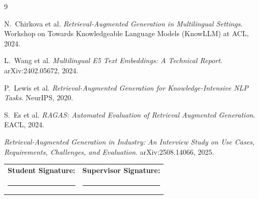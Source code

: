 \documentclass[10pt,a4paper]{article}
\begin{document}
\begingroup
\renewcommand{\refname}{\texorpdfstring{\color{mainblue}}{}Preliminary References}
\scriptsize
\begin{thebibliography}{9}
\setlength{\itemsep}{0pt}

N.\ Chirkova et al.
\textit{Retrieval-Augmented Generation in Multilingual Settings}.
Workshop on Towards Knowledgeable Language Models (KnowLLM) at ACL, 2024.

L.\ Wang et al.
\textit{Multilingual E5 Text Embeddings: A Technical Report}.
arXiv:2402.05672, 2024.

P.\ Lewis et al.
\textit{Retrieval-Augmented Generation for Knowledge-Intensive NLP Tasks}.
NeurIPS, 2020.

S.\ Es et al.
\textit{RAGAS: Automated Evaluation of Retrieval Augmented Generation}.
EACL, 2024.

\textit{Retrieval-Augmented Generation in Industry: An Interview Study on Use Cases, Requirements, Challenges, and Evaluation}.
arXiv:2508.14066, 2025.

\end{thebibliography}
\endgroup

\vspace{0.1em}

\noindent
\begin{tabularx}{\textwidth}{X X}
\textbf{Student Signature:} & \textbf{Supervisor Signature:} \\[0.9em]
\rule{0.42\textwidth}{0.4pt} & \rule{0.42\textwidth}{0.4pt} \\
\end{tabularx}
\end{document}
